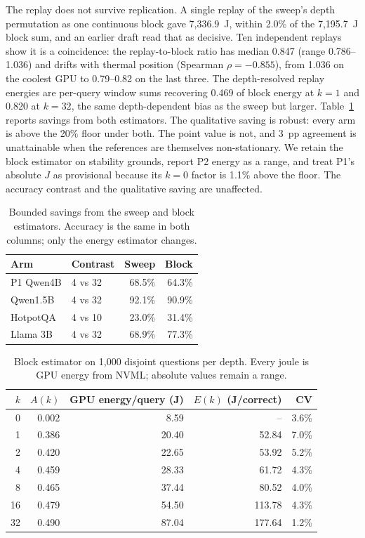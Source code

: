 \documentclass[a4paper,fleqn]{cas-sc}
\begin{document}
The replay does not survive replication. A single replay of the sweep's depth permutation as one continuous block gave 7{,}336.9~J, within 2.0\% of the 7{,}195.7~J block sum, and an earlier draft read that as decisive. Ten independent replays show it is a coincidence: the replay-to-block ratio has median 0.847 (range 0.786--1.036) and drifts with thermal position (Spearman $\rho=-0.855$), from 1.036 on the coolest GPU to 0.79--0.82 on the last three. The depth-resolved replay energies are per-query window sums recovering 0.469 of block energy at $k=1$ and 0.820 at $k=32$, the same depth-dependent bias as the sweep but larger. Table~\ref{tab:bounded} reports savings from both estimators. The qualitative saving is robust: every arm is above the 20\% floor under both. The point value is not, and 3~pp agreement is unattainable when the references are themselves non-stationary. We retain the block estimator on stability grounds, report P2 energy as a range, and treat P1's absolute $J$ as provisional because its $k=0$ factor is 1.1\% above the floor. The accuracy contrast and the qualitative saving are unaffected.

\begin{table}[pos=htbp]
  \centering
  \caption{Bounded savings from the sweep and block estimators. Accuracy is the same in both columns; only the energy estimator changes.}
  \label{tab:bounded}
  \footnotesize
  \begin{tabular}{@{}llrr@{}}
    \toprule
    \textbf{Arm} & \textbf{Contrast} & \textbf{Sweep} & \textbf{Block} \\
    \midrule
    P1 Qwen4B & 4 vs 32 & 68.5\% & 64.3\% \\
    Qwen1.5B & 4 vs 32 & 92.1\% & 90.9\% \\
    HotpotQA & 4 vs 10 & 23.0\% & 31.4\% \\
    Llama 3B & 4 vs 32 & 68.9\% & 77.3\% \\
    \bottomrule
  \end{tabular}
\end{table}

\begin{table}[pos=htbp]
  \centering
  \caption{Block estimator on 1{,}000 disjoint questions per depth. Every joule is GPU energy from NVML; absolute values remain a range.}
  \label{tab:p7blocks}
  \footnotesize
  \begin{tabular}{@{}rrrrr@{}}
    \toprule
    $k$ & $A(k)$ & GPU energy/query (J) & $E(k)$ (J/correct) & CV \\
    \midrule
    0  & 0.002 & 8.59  & --     & 3.6\% \\
    1  & 0.386 & 20.40 & 52.84  & 7.0\% \\
    2  & 0.420 & 22.65 & 53.92  & 5.2\% \\
    4  & 0.459 & 28.33 & 61.72  & 4.3\% \\
    8  & 0.465 & 37.44 & 80.52  & 4.0\% \\
    16 & 0.479 & 54.50 & 113.78 & 4.3\% \\
    32 & 0.490 & 87.04 & 177.64 & 1.2\% \\
    \bottomrule
  \end{tabular}
\end{table}
\end{document}
